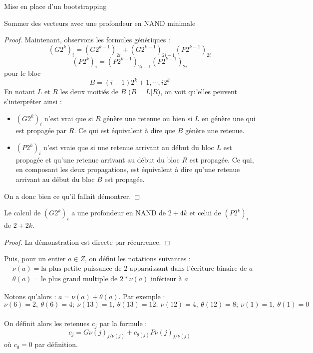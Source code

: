 \begin{section}{Mise en place d'un bootstrapping}
\begin{subsection}{Sommer des vecteurs avec une profondeur en NAND minimale}
\begin{proof}
	Maintenant, observons les formules génériques :
\[{(G2^k)_i} = {(G2^{k-1})_{2i}} + {(G2^{k-1})_{2i-1}}{(P2^{k-1})_{2i}}\]
\[{(P2^{k})_i} = {(P2^{k-1})_{2i-1}} {(P2^{k-1})_{2i}} \]
pour le bloc
\[B = (i-1)2^k + 1, \cdots, i 2^k\]
	En notant $L$ et $R$ les deux moitiés de $B$ ($B = L|R$), on voit qu'elles peuvent s'interpréter ainsi :
\begin{itemize}
\item $(G2^k)_i$ n'est vrai que si $R$ génère une retenue ou bien si $L$ en génère une qui est propagée par $R$. Ce qui est équivalent à dire que $B$ génère une retenue.
\item $(P2^{k})_i$ n'est vraie que si une retenue arrivant au début du bloc $L$ est propagée et qu'une retenue arrivant au début du bloc $R$ est propagée. Ce qui, en composant les deux propagations, est équivalent à dire qu'une retenue arrivant au début du bloc $B$ est propagée.  
\end{itemize}
	On a donc bien ce qu'il fallait démontrer.
\end{proof}

\begin{prop} \label{g_et_p}
Le calcul de $(G2^k)_i$ a une profondeur en NAND de $2 + 4k$ et celui de $(P2^k)_i$ de $2 + 2k$.
\end{prop}

\begin{proof}
	La démonstration est directe par récurrence. 
\end{proof}

	Puis, pour un entier $a \in Z$, on défini les notations suivantes :
\begin{align*}
	&\nu(a) = \text{la plus petite puissance de 2 apparaissant dans l'écriture binaire de $a$}\\
	&\theta(a) = \text{le plus grand multiple de $2*\nu(a)$ inférieur à $a$}
\end{align*}

	Notons qu'alors : $a = \nu(a) + \theta(a)$. Par exemple :
\[\nu(6) = 2,\ \theta(6) = 4;\ \nu(13) = 1,\ \theta(13) = 12;\ \nu(12)= 4,\ \theta(12) = 8;\ \nu(1) = 1,\ \theta(1) = 0\]

\paragraph{}

	On définit alors les retenues $c_j$ par la formule :
\[c_j = {G\nu(j)}_{j/\nu(j)} + c_{\theta(j)} {P\nu(j)}_{j/\nu(j)}\]
	où $c_0 = 0$ par définition.


\end{subsection}
\end{section}
